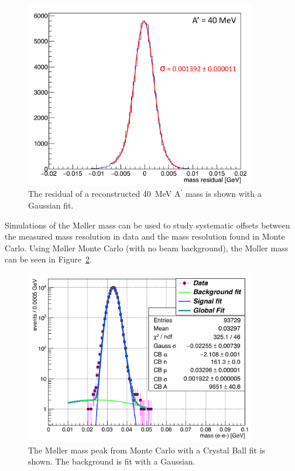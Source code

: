 \begin{figure}[H]
  \centering
      \includegraphics[width=0.9\textwidth]{pics/searching/ap40mev.png}
  \caption[Fit to the mass residual of a 40~MeV A$^{\prime}$]{The residual of a reconstructed 40~MeV A$^{\prime}$ mass is shown with a Gaussian fit.}
  \label{fig:ap40mev}
\end{figure} 

Simulations of the M\o ller mass can be used to study systematic offsets between the measured mass resolution in data and the mass resolution found in Monte Carlo. Using M\o ller Monte Carlo (with no beam background), the Moller mass can be seen in Figure~\ref{fig:mollerMC}. 

\begin{figure}[H]
  \centering
      \includegraphics[width=0.9\textwidth]{pics/searching/mollerMassMC.png}
  \caption[Fit to the M\o ller mass peak in Monte Carlo]{The M\o ller mass peak from Monte Carlo with a Crystal Ball fit is shown. The background is fit with a Gaussian.}
  \label{fig:mollerMC}
\end{figure} 

